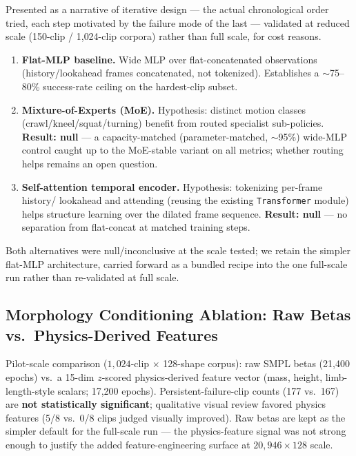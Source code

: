 Presented as a narrative of iterative design — the actual chronological order tried, each step
motivated by the failure mode of the last — validated at reduced scale (150-clip / 1{,}024-clip
corpora) rather than full scale, for cost reasons.

\begin{enumerate}
  \item \textbf{Flat-MLP baseline.} Wide MLP over flat-concatenated observations (history/lookahead
  frames concatenated, not tokenized). Establishes a $\sim$75--80\% success-rate ceiling on the
  hardest-clip subset.
  \item \textbf{Mixture-of-Experts (MoE).} Hypothesis: distinct motion classes
  (crawl/kneel/squat/turning) benefit from routed specialist sub-policies. \textbf{Result: null} —
  a capacity-matched (parameter-matched, $\sim$95\%) wide-MLP control caught up to the MoE-stable
  variant on all metrics; whether routing helps remains an open question.
  \item \textbf{Self-attention temporal encoder.} Hypothesis: tokenizing per-frame history/
  lookahead and attending (reusing the existing \texttt{Transformer} module) helps structure
  learning over the dilated frame sequence. \textbf{Result: null} — no separation from flat-concat
  at matched training steps.
\end{enumerate}

Both alternatives were null/inconclusive at the scale tested; we retain the simpler flat-MLP
architecture, carried forward as a bundled recipe into the one full-scale run rather than
re-validated at full scale.

\subsection{Morphology Conditioning Ablation: Raw Betas vs.\ Physics-Derived Features}
\label{sec:exp:morphology}

Pilot-scale comparison ($1{,}024$-clip $\times$ 128-shape corpus): raw SMPL betas
(21{,}400 epochs) vs.\ a 15-dim $z$-scored physics-derived feature vector (mass, height,
limb-length-style scalars; 17{,}200 epochs). Persistent-failure-clip counts (177 vs.\ 167) are
\textbf{not statistically significant}; qualitative visual review favored physics features (5/8
vs.\ 0/8 clips judged visually improved). Raw betas are kept as the simpler default for the
full-scale run — the physics-feature signal was not strong enough to justify the added
feature-engineering surface at $20{,}946 \times 128$ scale.

